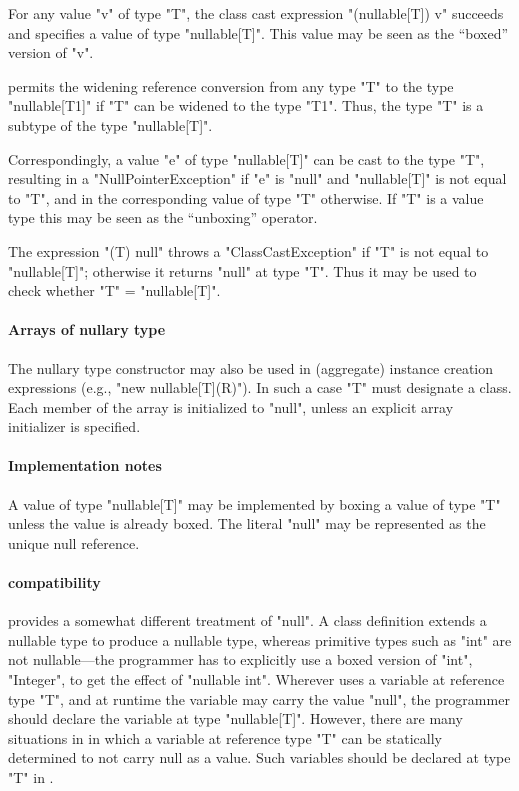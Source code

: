 For any value \xcd"v" of type \xcd"T", the class cast expression
\xcd"(nullable[T]) v" succeeds and specifies a value of type \xcd"nullable[T]".
This value may be seen as the ``boxed'' version of \xcd"v".

\Xten{} permits the widening reference conversion from any type \xcd"T"
to the type \xcd"nullable[T1]" if \xcd"T" can be widened to the
type \xcd"T1". Thus, the type \xcd"T" is a subtype of the type \xcd"nullable[T]".

Correspondingly, a value \xcd"e" of type \xcd"nullable[T]" can be cast to the
type \xcd"T", resulting in a \xcd"NullPointerException" if \xcd"e" is
\xcd"null" and \xcd"nullable[T]" is not equal to \xcd"T", and in the
corresponding value of type \xcd"T" otherwise.  If \xcd"T" is a value
type this may be seen as the ``unboxing'' operator.

The expression \xcd"(T) null" throws a \xcd"ClassCastException"
if \xcd"T" is not equal to \xcd"nullable[T]"; otherwise it
returns \xcd"null" at type \xcd"T". Thus it may be used to check
whether \xcd"T" = \xcd"nullable[T]".

\paragraph{Arrays of nullary type}
The nullary type constructor may also be used in (aggregate) instance
creation expressions (e.g., \xcd"new nullable[T](R)"). In such a
case \xcd"T" must designate a class. Each member of the array is
initialized to \xcd"null", unless an explicit array initializer is
specified.

\paragraph{Implementation notes}
A value of type \xcd"nullable[T]" may be implemented by boxing a value of
type \xcd"T" unless the value is already boxed. The literal \xcd"null"
may be represented as the unique null reference.

\paragraph{\Java{} compatibility}

\java{} provides a somewhat different treatment of \xcd"null".  A
class definition extends a nullable type to produce a nullable type,
whereas primitive types such as \xcd"int" are not nullable---the
programmer has to explicitly use a boxed version of \xcd"int",
\xcd"Integer", to get the effect of \xcd"nullable int". Wherever \Java{} uses a
variable at reference type \xcd"T", and at runtime the variable may
carry the value \xcd"null", the \Xten{} programmer should declare the
variable at type \xcd"nullable[T]". However, there are many situations
in \java{} in which a variable at reference type \xcd"T" can be
statically determined to not carry null as a value. Such variables
should be declared at type \xcd"T" in \Xten{}.

